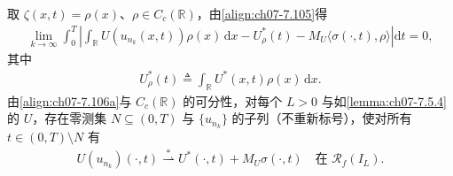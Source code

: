 \documentclass[../../main.tex]{subfiles}%
\begin{document}
\begin{remark}\label{remark:ch07-7.5.1}
取 $\zeta(x,t)=\rho(x)$、$\rho\in C_c(\mathbb{R})$，由\eqref{align:ch07-7.105}得
\begin{align}
\lim_{k\to\infty}\int_0^T\left|\int_{\mathbb{R}}U(u_{n_k}(x,t))\rho(x)\,\mathrm{d}x-U_\rho^*(t)-M_U\langle\sigma(\cdot,t),\rho\rangle\right|\mathrm{d}t=0, \label{align:ch07-7.106a}
\end{align}
其中
\begin{align}
U_\rho^*(t)\triangleq \int_{\mathbb{R}}U^*(x,t)\rho(x)\,\mathrm{d}x. \label{align:ch07-7.106b}
\end{align}
由\eqref{align:ch07-7.106a}与 $C_c(\mathbb{R})$ 的可分性，对每个 $L>0$ 与如\cref{lemma:ch07-7.5.4}的 $U$，存在零测集 $N\subseteq(0,T)$ 与 $\{u_{n_k}\}$ 的子列（不重新标号），使对所有 $t\in(0,T)\setminus N$ 有
\begin{align}
U(u_{n_k})(\cdot,t)\stackrel{*}{\rightharpoonup}U^*(\cdot,t)+M_U\sigma(\cdot,t)\quad\text{在 }\mathscr{R}_f(I_L). \label{align:ch07-7.107}
\end{align}
\end{remark}
\end{document}
